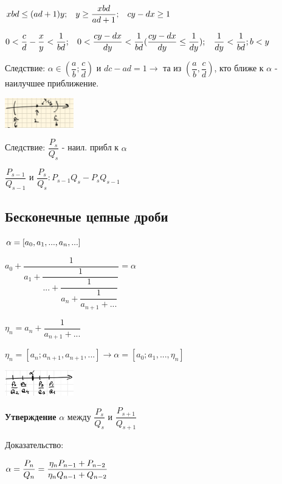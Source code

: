 \documentclass[12pt]{article}
\begin{document}
$xbd \leq (ad+1)y ; \hspace{2 ex} y \geq \dfrac{xbd}{ad+1} ;\hspace{2 ex} cy - dx \geq 1$

$0 < \dfrac{c}{d} - \dfrac{x}{y} < \dfrac{1}{bd} ;\hspace{2 ex} 0< \dfrac{cy - dx}{dy} < \dfrac{1}{bd} (\dfrac{cy - dx}{dy} \leq \dfrac{1}{dy}); \hspace{2 ex} \dfrac{1}{dy} < \dfrac{1}{bd} ; b<y$

Следствие: $\alpha \in (\dfrac{a}{b};\dfrac{c}{d})$ и $dc - ad = 1 \rightarrow$ та из $(\dfrac{a}{b}, \dfrac{c}{d})$, кто ближе к $\alpha$ - наилучшее приближение.

\includegraphics[width=30mm]{image3.png}

Следствие: $\dfrac{P_s}{Q_s} $ - наил. прибл к $\alpha$

$\dfrac{P_{s-1}}{Q_{s-1}}$ и $\dfrac{P_s}{Q_s} : P_{s-1} Q_s - P_s Q_{s-1}$


\subsection{Бесконечные цепные дроби}
$\alpha = [a_0,a_1,...,a_n,...] \vspace{1 ex}$

$ a_0 + \dfrac{1}{a_1 + \dfrac{1}{... + \dfrac{1}{a_n + \dfrac{1}{a_{n+1} + ...}}}} = \alpha$

$\eta_n = a_n + \dfrac{1}{a_{n + 1} + ...}$

$\eta_n = [a_n;a_{n+1}, a_{n+1}, ...] \rightarrow \alpha = [a_0;a_1,...,\eta_n]$

\includegraphics[width=30mm]{image.png}

\textbf{Утверждение} $\alpha$ между $\dfrac{P_s}{Q_s}$ и $\dfrac{P_{s+1}}{Q_{s+1}} $

Доказательство:

$\alpha = \dfrac{P_n}{Q_n} = \dfrac{\eta_n P_{n-1} + P_{n-2}}{\eta_n Q_{n-1} + Q_{n-2}} \vspace{2 ex}$
\end{document}
